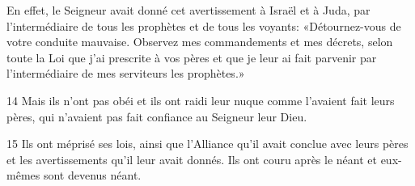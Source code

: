 En effet, le Seigneur avait donné cet avertissement à Israël et à Juda, par l’intermédiaire de tous les prophètes et de tous les voyants: «Détournez-vous de votre conduite mauvaise. Observez mes commandements et mes décrets, selon toute la Loi que j’ai prescrite à vos pères et que je leur ai fait parvenir par l’intermédiaire de mes serviteurs les prophètes.»

14 Mais ils n’ont pas obéi et ils ont raidi leur nuque comme l’avaient fait leurs pères, qui n’avaient pas fait confiance au Seigneur leur Dieu.

15 Ils ont méprisé ses lois, ainsi que l’Alliance qu’il avait conclue avec leurs pères et les avertissements qu’il leur avait donnés. Ils ont couru après le néant et eux-mêmes sont devenus néant.